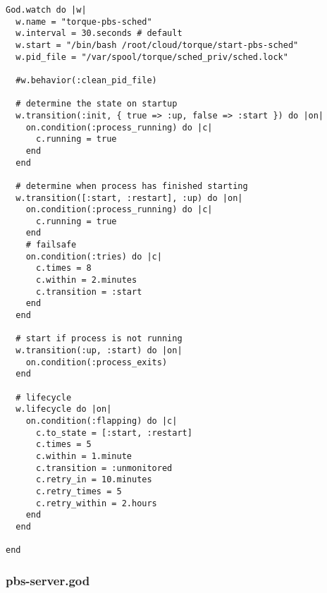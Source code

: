 \begin{lstlisting}
God.watch do |w|
  w.name = "torque-pbs-sched"
  w.interval = 30.seconds # default      
  w.start = "/bin/bash /root/cloud/torque/start-pbs-sched"
  w.pid_file = "/var/spool/torque/sched_priv/sched.lock"
    
  #w.behavior(:clean_pid_file)
  
  # determine the state on startup    
  w.transition(:init, { true => :up, false => :start }) do |on|      
    on.condition(:process_running) do |c|        
      c.running = true     
    end    
  end     

  # determine when process has finished starting    
  w.transition([:start, :restart], :up) do |on|      
    on.condition(:process_running) do |c|        
      c.running = true      
    end       
    # failsafe      
    on.condition(:tries) do |c|        
      c.times = 8        
      c.within = 2.minutes        
      c.transition = :start      
    end    
  end     

  # start if process is not running    
  w.transition(:up, :start) do |on|      
    on.condition(:process_exits)    
  end     

  # lifecycle    
  w.lifecycle do |on|      
    on.condition(:flapping) do |c|        
      c.to_state = [:start, :restart]        
      c.times = 5        
      c.within = 1.minute        
      c.transition = :unmonitored        
      c.retry_in = 10.minutes        
      c.retry_times = 5        
      c.retry_within = 2.hours      
    end    
  end
  
end
\end{lstlisting}


\subsubsection{pbs-server.god}


